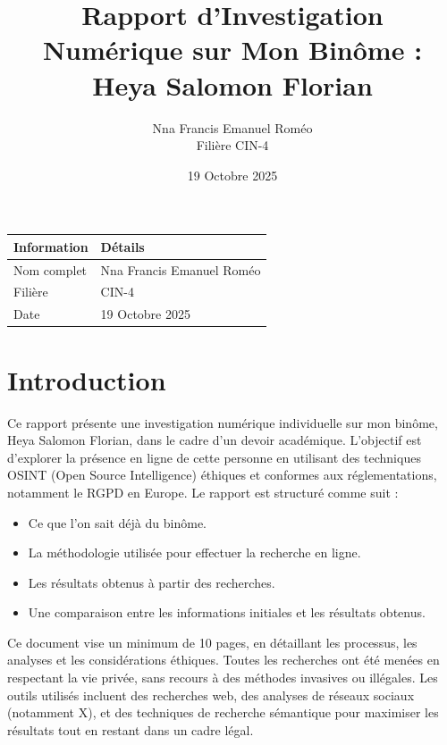 \documentclass[12pt,a4paper]{article}
\title{\textbf{Rapport d'Investigation Numérique sur Mon Binôme : Heya Salomon Florian}}
\author{Nna Francis Emanuel Roméo \\ Filière CIN-4}
\date{19 Octobre 2025}
\begin{document}
\maketitle

\begin{center}
    \vspace{0.5cm}
    \begin{tabular}{ll}
        \toprule
        \textbf{Information} & \textbf{Détails} \\
        \midrule
        Nom complet & Nna Francis Emanuel Roméo \\
        Filière & CIN-4 \\
        Date & 19 Octobre 2025 \\
        \bottomrule
    \end{tabular}
\end{center}

\tableofcontents
\newpage

\section{Introduction}
Ce rapport présente une investigation numérique individuelle sur mon binôme, Heya Salomon Florian, dans le cadre d'un devoir académique. L'objectif est d'explorer la présence en ligne de cette personne en utilisant des techniques OSINT (Open Source Intelligence) éthiques et conformes aux réglementations, notamment le RGPD en Europe. Le rapport est structuré comme suit :
\begin{itemize}
    \item Ce que l'on sait déjà du binôme.
    \item La méthodologie utilisée pour effectuer la recherche en ligne.
    \item Les résultats obtenus à partir des recherches.
    \item Une comparaison entre les informations initiales et les résultats obtenus.
\end{itemize}

Ce document vise un minimum de 10 pages, en détaillant les processus, les analyses et les considérations éthiques. Toutes les recherches ont été menées en respectant la vie privée, sans recours à des méthodes invasives ou illégales. Les outils utilisés incluent des recherches web, des analyses de réseaux sociaux (notamment X), et des techniques de recherche sémantique pour maximiser les résultats tout en restant dans un cadre légal.
\end{document}
